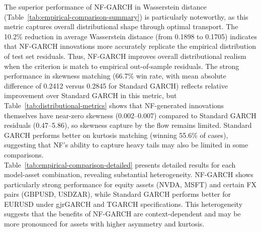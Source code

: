 \documentclass[oneside,12pt]{CUEDthesisPSnPDF}
\begin{document}
The superior performance of NF-GARCH in Wasserstein distance (Table~\ref{tab:empirical-comparison-summary}) is particularly noteworthy, as this metric captures overall distributional shape through optimal transport. The 10.2\% reduction in average Wasserstein distance (from 0.1898 to 0.1705) indicates that NF-GARCH innovations more accurately replicate the empirical distribution of test set residuals. Thus, NF-GARCH improves overall distributional realism when the criterion is match to empirical out-of-sample residuals. The strong performance in skewness matching (66.7\% win rate, with mean absolute difference of 0.2412 versus 0.2845 for Standard GARCH) reflects relative improvement over Standard GARCH in this metric, but Table~\ref{tab:distributional-metrics} shows that NF-generated innovations themselves have near-zero skewness (0.002--0.007) compared to Standard GARCH residuals (0.47--5.86), so skewness capture by the flow remains limited. Standard GARCH performs better on kurtosis matching (winning 55.6\% of cases), suggesting that NF's ability to capture heavy tails may also be limited in some comparisons.\\

Table~\ref{tab:empirical-comparison-detailed} presents detailed results for each model-asset combination, revealing substantial heterogeneity. NF-GARCH shows particularly strong performance for equity assets (NVDA, MSFT) and certain FX pairs (GBPUSD, USDZAR), while Standard GARCH performs better for EURUSD under gjrGARCH and TGARCH specifications. This heterogeneity suggests that the benefits of NF-GARCH are context-dependent and may be more pronounced for assets with higher asymmetry and kurtosis.\\
\end{document}
